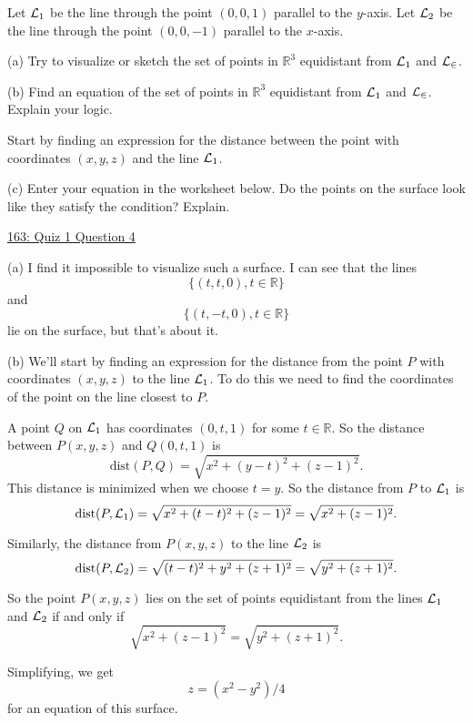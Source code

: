 \documentclass{ximera}
\begin{document}
\begin{question}  \label{Qpo8873032}
Let ${\cal L}_1$ be the line through the point $(0,0,1)$ parallel to the $y$-axis. Let ${\cal L}_2$ be the line through the point $(0,0,-1)$ parallel to the $x$-axis.

(a) Try to visualize or sketch the set of points in $\mathbb{R}^3$ equidistant from ${\cal L}_1$ and ${\cal L_2}$.

(b) Find an equation of the set of points in $\mathbb{R}^3$ equidistant from ${\cal L}_1$ and ${\cal L_2}$. Explain your logic.

\begin{hint}
Start by finding an expression for the distance between the point with coordinates $(x,y,z)$ and the line ${\cal L}_1$.
\end{hint}

(c) Enter  your equation in the worksheet below. Do the points on the surface look like they satisfy the condition? Explain.

\begin{onlineOnly}
    \begin{center}
\end{center}
\end{onlineOnly}

\href{https://www.desmos.com/3d/pzksnds2pe}{163: Quiz 1 Question 4}


\begin{explanation}

(a) I find it impossible to visualize such a surface. I can see that the lines
\[
      \{ (t,t,0) , t \in \mathbb{R}   \}
\]
and
\[
      \{ (t,-t,0) , t \in \mathbb{R}   \}
\]
lie on the surface, but that's about it.   %

(b) We'll start by finding an expression for the distance from the point $P$ with coordinates $(x,y,z)$ to the line ${\cal L}_1$. To do this we need to find the coordinates of the point on the line closest to $P$.

A point $Q$ on ${\cal L}_1$ has coordinates $(0,t,1)$ for some $t\in \mathbb{R}$. So the distance between $P(x,y,z)$ and $Q(0,t,1)$ is 
\[
       \text{dist}(P,Q) = \sqrt{x^2 + (y-t)^2 + (z-1)^2} .
\] 
This distance is minimized when we choose $t=y$. So the distance from $P$ to ${\cal L}_1$ is
\[
        \text{dist}(P,{\cal L}_1) = \sqrt{x^2 + (t-t)^2 + (z-1)^2} = \sqrt{x^2 + (z-1)^2} .
\]

Similarly, the distance from $P(x,y,z)$ to the line ${\cal L}_2$ is
\[
        \text{dist}(P,{\cal L}_2) = \sqrt{(t-t)^2 + y^2 + (z+1)^2} = \sqrt{y^2 + (z+1)^2} .
\]

So the point $P(x,y,z)$ lies on the set of points equidistant from the lines ${\cal L}_1$ and ${\cal L}_2$ if and only if
\[
      \sqrt{x^2 + (z-1)^2} = \sqrt{y^2 + (z+1)^2}  .
\] 

Simplifying, we get
\[
      z = \left( x^2 - y^2 \right)/4
\]
for an equation of this surface.
\end{explanation}



\end{question}
\end{document}
